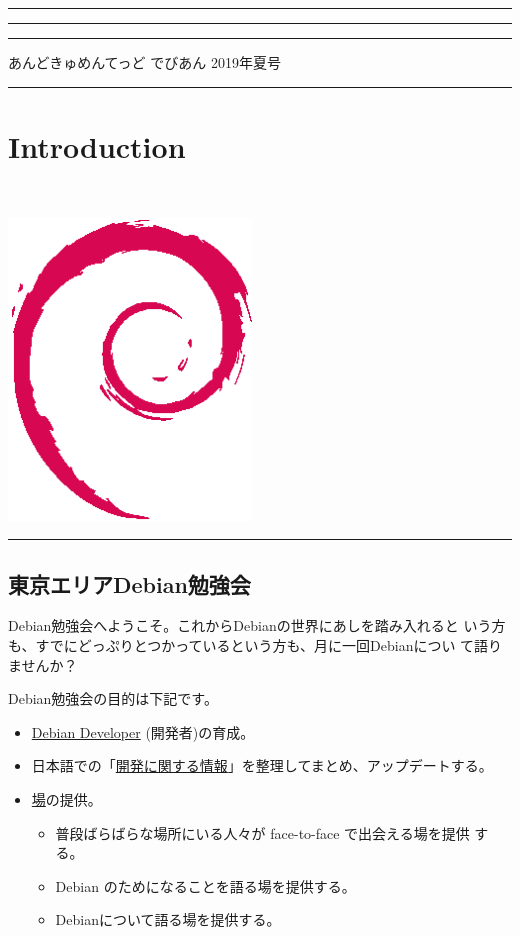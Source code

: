 \documentclass[mingoth,a4paper]{jsarticle}
\renewcommand{\dancersection}[2]{%
\newpage
あんどきゅめんてっど でびあん 2019年夏号
%
\vspace{0.1mm}\\
{\color{dancerdarkblue}\rule{\hsize}{2mm}}

%
%
\begin{minipage}[t]{0.6\hsize}
\color{dancerdarkblue}
\vspace{1cm}
\section{#1}
\hfill{}#2\\
\end{minipage}
\begin{minipage}[t]{0.4\hsize}
\vspace{-2cm}
\hfill{}\includegraphics[height=8cm]{image200502/openlogo-nd.eps}\\
\vspace{-5cm}
\end{minipage}
%
{\color{dancerlightblue}\rule{0.66\hsize}{2mm}}
%
\vspace{2cm}
}
\begin{document}
\setcounter{page}{1}
\begin{minipage}[]{0.2\hsize}
 \colorbox{dancerlightblue}{}
\end{minipage}
\begin{minipage}[]{0.8\hsize}
\hrule
\vspace{1mm}
\hrule
\setcounter{tocdepth}{1}
{\small
\begin{multicols}{2}
  \tableofcontents
\end{multicols}
} %
\vspace{1mm}
\hrule
\vspace{3cm}

\end{minipage}

\dancersection{Introduction}{ }

\subsection{東京エリアDebian勉強会}

 Debian勉強会へようこそ。これからDebianの世界にあしを踏み入れると
 いう方も、すでにどっぷりとつかっているという方も、月に一回Debianについ
 て語りませんか？

 Debian勉強会の目的は下記です。

\begin{itemize}
 \item \underline{Debian Developer} (開発者)の育成。
 \item 日本語での「\underline{開発に関する情報}」を整理してまとめ、アップデートする。
 \item \underline{場}の提供。
 \begin{itemize}
  \item 普段ばらばらな場所にいる人々が face-to-face で出会える場を提供
	する。
  \item Debian のためになることを語る場を提供する。
  \item Debianについて語る場を提供する。
 \end{itemize}
\end{itemize}
\end{document}

